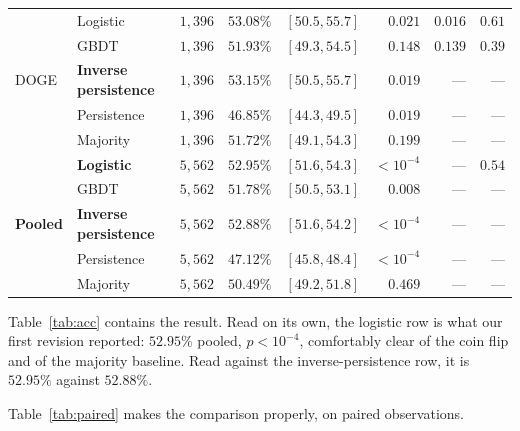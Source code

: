 \documentclass[preprint,12pt,authoryear]{elsarticle}
\begin{document}
\begin{table}[t]
{\begin{tabular}{@{}llrrcrrr@{}}
\midrule
\multirow{5}{*}{DOGE}
 & Logistic                     & $1{,}396$ & $53.08\%$ & $[50.5, 55.7]$ & $0.021$ & $0.016$ & $0.61$ \\
 & GBDT                         & $1{,}396$ & $51.93\%$ & $[49.3, 54.5]$ & $0.148$ & $0.139$ & $0.39$ \\
 & \textbf{Inverse persistence} & $1{,}396$ & $\mathbf{53.15\%}$ & $[50.5, 55.7]$ & $0.019$ & --- & --- \\
 & Persistence                  & $1{,}396$ & $46.85\%$ & $[44.3, 49.5]$ & $0.019$ & --- & --- \\
 & Majority                     & $1{,}396$ & $51.72\%$ & $[49.1, 54.3]$ & $0.199$ & --- & --- \\
\midrule
\multirow{5}{*}{\textbf{Pooled}}
 & \textbf{Logistic}            & $5{,}562$ & $\mathbf{52.95\%}$ & $[51.6, 54.3]$ & $<10^{-4}$ & --- & $0.54$ \\
 & GBDT                         & $5{,}562$ & $51.78\%$ & $[50.5, 53.1]$ & $0.008$ & --- & --- \\
 & \textbf{Inverse persistence} & $5{,}562$ & $\mathbf{52.88\%}$ & $[51.6, 54.2]$ & $<10^{-4}$ & --- & --- \\
 & Persistence                  & $5{,}562$ & $47.12\%$ & $[45.8, 48.4]$ & $<10^{-4}$ & --- & --- \\
 & Majority                     & $5{,}562$ & $50.49\%$ & $[49.2, 51.8]$ & $0.469$ & --- & --- \\
\bottomrule
\end{tabular}}
\end{table}

Table~\ref{tab:acc} contains the result. Read on its own, the logistic row is
what our first revision reported: $52.95\%$ pooled, $p < 10^{-4}$, comfortably
clear of the coin flip and of the majority baseline. Read against the
inverse-persistence row, it is $52.95\%$ against $52.88\%$.

Table~\ref{tab:paired} makes the comparison properly, on paired observations.
\end{document}

